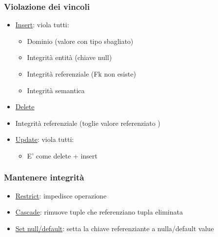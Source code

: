 \subsubsection*{Violazione dei vincoli}
\begin{itemize}
  \item \underline{Insert}: viola tutti: 
    \begin{itemize}
      \item Dominio (valore con tipo sbagliato)
      \item Integrità entità (chiave null)
      \item Integrità referenziale (Fk non esiste)
      \item Integrità semantica
    \end{itemize}
  \item \underline{Delete} 
  \item Integrità referenziale (toglie valore referenziato )
    \item \underline{Update}: viola tutti:
      \begin{itemize}
        \item E' come delete + insert
      \end{itemize}
\end{itemize}
\subsubsection*{Mantenere integrità}
\begin{itemize}
    \item \underline{Restrict}: impedisce operazione
  \item \underline{Cascade}: rimuove tuple che referenziano tupla eliminata
  \item \underline{Set null/default}: setta la chiave referenziante a nulla/default value
\end{itemize}
